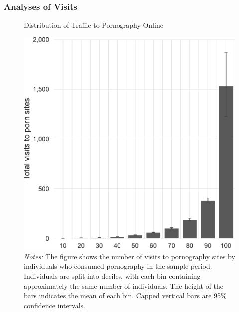 \documentclass[12pt,twoside]{article}
\begin{document}
\subsubsection{Analyses of Visits}
\label{si:visits}
\begin{figure}[ht]
	\centering
	\caption{Distribution of Traffic to Pornography Online}
	\includegraphics[width=.5\linewidth]{figs/distribution_visits_to_adultsites.pdf}
	\caption*{\footnotesize \emph{Notes:} 
		The figure shows the number of visits to pornography sites by individuals who consumed pornography in the sample period.
		Individuals are split into deciles, with each bin containing approximately the same number of individuals.
		The height of the bars indicates the mean of each bin.
		Capped vertical bars are 95\% confidence intervals.
	}
	\label{fig:distribution_visits}
\end{figure}
\end{document}
